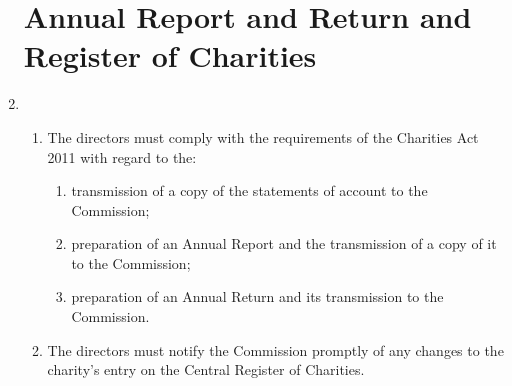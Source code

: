 \documentclass{article}
\begin{document}
\begin{enumerate}[label=\arabic*, start=23]
    \section{Annual Report and Return and Register of Charities}
    \item \begin{enumerate}[label=(\arabic*)]
        \item The directors must comply with the requirements of the
        Charities Act 2011 with regard to the:
        \begin{enumerate}[label=(\alph*)]
            \item transmission of a copy of the statements of account to
            the Commission;
            \item preparation of an Annual Report and the transmission of a
            copy of it to the Commission;
            \item preparation of an Annual Return and its transmission to
            the Commission.
        \end{enumerate}
        \item The directors must notify the Commission promptly of
        any changes to the charity's entry on the Central Register
        of Charities.
    \end{enumerate}
    

\end{enumerate}
\end{document}
